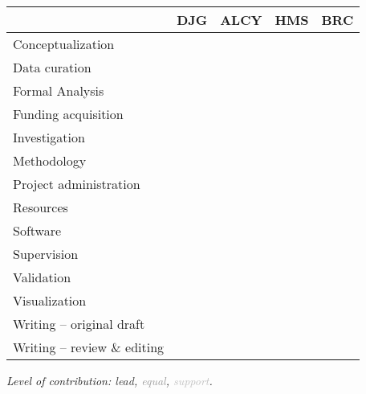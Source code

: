 \documentclass[9pt,biorxiv,lineno,onehalfspacing]{lapreprint}
\begin{document}
\begin{refsection}


\begin{table}[h!]
\begin{tabularx}{\textwidth}{|l|X|X|X|X|}
\hline
 & DJG & ALCY & HMS & BRC \\ \hline
Conceptualization  &  &  &  &  \\ \hline
Data curation &  &  &  &  \\ \hline
Formal Analysis &  &  &  &  \\ \hline
Funding acquisition &  &  &  &  \\ \hline
Investigation &  &  &  &  \\ \hline
Methodology &  &  &  &  \\ \hline
Project administration &  &  &  &  \\ \hline
Resources &  &  &  &  \\ \hline
Software &  &  &  &  \\ \hline
Supervision &  &  &  &  \\ \hline
Validation &  &  &  &  \\ \hline
Visualization &  &  &  &  \\ \hline
Writing – original draft &  &  &  &  \\ \hline
Writing – review \& editing &  &  &  &  \\ \hline
\end{tabularx}
\end{table}

\noindent
\textit{Level of contribution: \textcolor[HTML]{343434}{lead}, \textcolor[HTML]{9B9B9B}{equal}, \textcolor[HTML]{C0C0C0}{support}.}

\clearpage
\printbibliography[title=Main Text References]
\end{refsection}

\if@endfloat\clearpage\processdelayedfloats\clearpage\fi 
\end{document}
